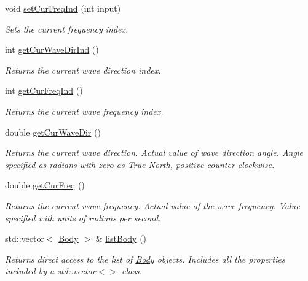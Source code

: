 \begin{DoxyCompactItemize}
void \hyperlink{classosea_1_1ofreq_1_1_system_a76c849ddc8e6d9cc628f4208df2ea950}{set\-Cur\-Freq\-Ind} (int input)
\begin{DoxyCompactList}\small\item\em Sets the current frequency index. \end{DoxyCompactList}\item 
int \hyperlink{classosea_1_1ofreq_1_1_system_aff94e0e384f1c55cccfa0f0238e445b8}{get\-Cur\-Wave\-Dir\-Ind} ()
\begin{DoxyCompactList}\small\item\em Returns the current wave direction index. \end{DoxyCompactList}\item 
int \hyperlink{classosea_1_1ofreq_1_1_system_ae348a554ad912c084343e96c3a7b8647}{get\-Cur\-Freq\-Ind} ()
\begin{DoxyCompactList}\small\item\em Returns the current wave frequency index. \end{DoxyCompactList}\item 
double \hyperlink{classosea_1_1ofreq_1_1_system_aea8c3cb08e84051a4325c06c5a7185fa}{get\-Cur\-Wave\-Dir} ()
\begin{DoxyCompactList}\small\item\em Returns the current wave direction. Actual value of wave direction angle. Angle specified as radians with zero as True North, positive counter-\/clockwise. \end{DoxyCompactList}\item 
double \hyperlink{classosea_1_1ofreq_1_1_system_ac4dec1ad6e8745d87f18dfb91bbd8f6b}{get\-Cur\-Freq} ()
\begin{DoxyCompactList}\small\item\em Returns the current wave frequency. Actual value of the wave frequency. Value specified with units of radians per second. \end{DoxyCompactList}\item 
std\-::vector$<$ \hyperlink{classosea_1_1ofreq_1_1_body}{Body} $>$ \& \hyperlink{classosea_1_1ofreq_1_1_system_adf2b36b23ce4bca11639f8dd8bb48918}{list\-Body} ()
\begin{DoxyCompactList}\small\item\em Returns direct access to the list of \hyperlink{classosea_1_1ofreq_1_1_body}{Body} objects. Includes all the properties included by a std\-::vector$<$$>$ class. \end{DoxyCompactList}\item 

\end{DoxyCompactItemize}
